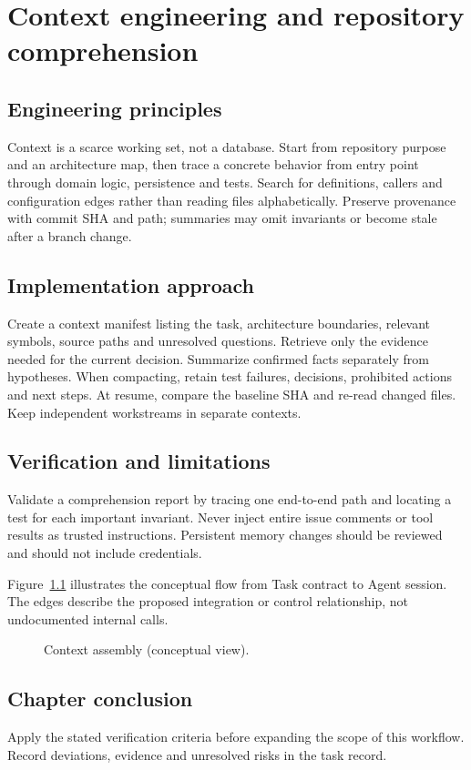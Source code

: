 \chapter{Context engineering and repository comprehension}

\section{Engineering principles}

Context is a scarce working set, not a database. Start from repository purpose and an architecture map, then trace a concrete behavior from entry point through domain logic, persistence and tests. Search for definitions, callers and configuration edges rather than reading files alphabetically. Preserve provenance with commit SHA and path; summaries may omit invariants or become stale after a branch change.

\section{Implementation approach}

Create a context manifest listing the task, architecture boundaries, relevant symbols, source paths and unresolved questions. Retrieve only the evidence needed for the current decision. Summarize confirmed facts separately from hypotheses. When compacting, retain test failures, decisions, prohibited actions and next steps. At resume, compare the baseline SHA and re-read changed files. Keep independent workstreams in separate contexts.

\section{Verification and limitations}

Validate a comprehension report by tracing one end-to-end path and locating a test for each important invariant. Never inject entire issue comments or tool results as trusted instructions. Persistent memory changes should be reviewed and should not include credentials.

Figure~\ref{fig:d7} illustrates the conceptual flow from Task contract to Agent session. The edges describe the proposed integration or control relationship, not undocumented internal calls.

\begin{figure}[htbp]\centering\caption{Context assembly (conceptual view).}\label{fig:d7}\end{figure}

\section{Chapter conclusion}

Apply the stated verification criteria before expanding the scope of this workflow. Record deviations, evidence and unresolved risks in the task record.
